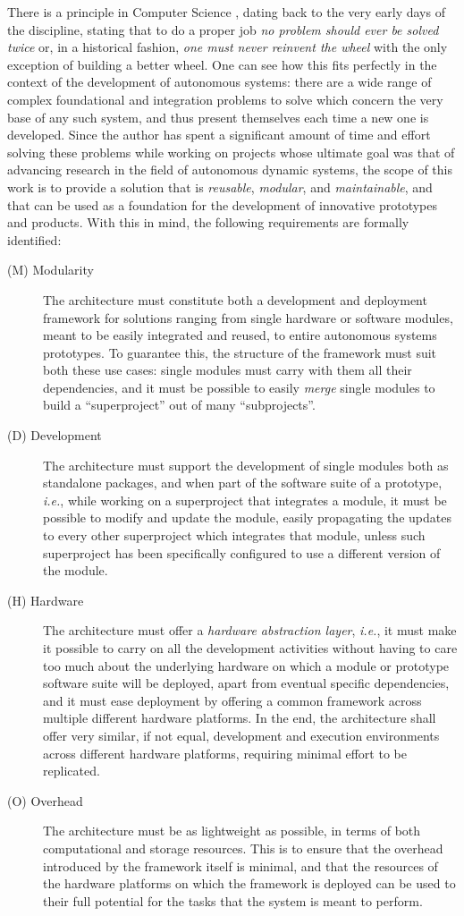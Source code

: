 There is a principle in Computer Science \cite{raymond_how_2001}, dating back to the very early days of the discipline, stating that to do a proper job \emph{no problem should ever be solved twice} or, in a historical fashion, \emph{one must never reinvent the wheel} with the only exception of building a better wheel. One can see how this fits perfectly in the context of the development of autonomous systems: there are a wide range of complex foundational and integration problems to solve which concern the very base of any such system, and thus present themselves each time a new one is developed. Since the author has spent a significant amount of time and effort solving these problems while working on projects whose ultimate goal was that of advancing research in the field of autonomous dynamic systems, the scope of this work is to provide a solution that is \emph{reusable}, \emph{modular}, and \emph{maintainable}, and that can be used as a foundation for the development of innovative prototypes and products. With this in mind, the following requirements are formally identified:
\begin{description}
  \item[(M) Modularity] The architecture must constitute both a development and deployment framework for solutions ranging from single hardware or software modules, meant to be easily integrated and reused, to entire autonomous systems prototypes. To guarantee this, the structure of the framework must suit both these use cases: single modules must carry with them all their dependencies, and it must be possible to easily \emph{merge} single modules to build a ``superproject'' out of many ``subprojects''.
  \item[(D) Development] The architecture must support the development of single modules both as standalone packages, and when part of the software suite of a prototype, \emph{i.e.}, while working on a superproject that integrates a module, it must be possible to modify and update the module, easily propagating the updates to every other superproject which integrates that module, unless such superproject has been specifically configured to use a different version of the module.
  \item[(H) Hardware] The architecture must offer a \emph{hardware abstraction layer}, \emph{i.e.}, it must make it possible to carry on all the development activities without having to care too much about the underlying hardware on which a module or prototype software suite will be deployed, apart from eventual specific dependencies, and it must ease deployment by offering a common framework across multiple different hardware platforms. In the end, the architecture shall offer very similar, if not equal, development and execution environments across different hardware platforms, requiring minimal effort to be replicated.
  \item[(O) Overhead] The architecture must be as lightweight as possible, in terms of both computational and storage resources. This is to ensure that the overhead introduced by the framework itself is minimal, and that the resources of the hardware platforms on which the framework is deployed can be used to their full potential for the tasks that the system is meant to perform.
\end{description}
